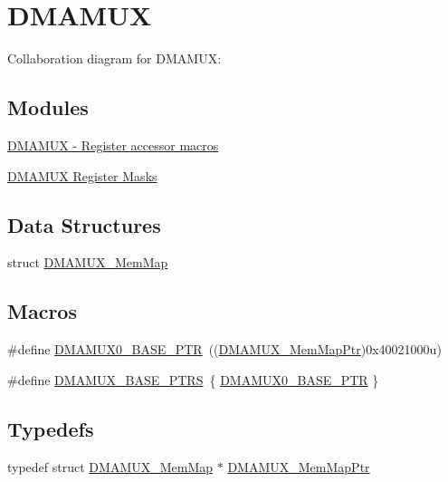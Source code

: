 \hypertarget{group___d_m_a_m_u_x___peripheral}{}\section{D\+M\+A\+M\+UX}
\label{group___d_m_a_m_u_x___peripheral}
Collaboration diagram for D\+M\+A\+M\+UX\+:
\subsection*{Modules}
\begin{DoxyCompactItemize}
\item 
\hyperlink{group___d_m_a_m_u_x___register___accessor___macros}{D\+M\+A\+M\+U\+X -\/ Register accessor macros}
\item 
\hyperlink{group___d_m_a_m_u_x___register___masks}{D\+M\+A\+M\+U\+X Register Masks}
\end{DoxyCompactItemize}
\subsection*{Data Structures}
\begin{DoxyCompactItemize}
\item 
struct \hyperlink{struct_d_m_a_m_u_x___mem_map}{D\+M\+A\+M\+U\+X\+\_\+\+Mem\+Map}
\end{DoxyCompactItemize}
\subsection*{Macros}
\begin{DoxyCompactItemize}
\item 
\#define \hyperlink{group___d_m_a_m_u_x___peripheral_ga403b61d306820e4e1113c636300004a3}{D\+M\+A\+M\+U\+X0\+\_\+\+B\+A\+S\+E\+\_\+\+P\+TR}~((\hyperlink{group___d_m_a_m_u_x___peripheral_ga736ab5b1ed284b3b4fdb63010a576777}{D\+M\+A\+M\+U\+X\+\_\+\+Mem\+Map\+Ptr})0x40021000u)
\item 
\#define \hyperlink{group___d_m_a_m_u_x___peripheral_gaad218c12978071501dc2899f0624de4b}{D\+M\+A\+M\+U\+X\+\_\+\+B\+A\+S\+E\+\_\+\+P\+T\+RS}~\{ \hyperlink{group___d_m_a_m_u_x___peripheral_ga403b61d306820e4e1113c636300004a3}{D\+M\+A\+M\+U\+X0\+\_\+\+B\+A\+S\+E\+\_\+\+P\+TR} \}
\end{DoxyCompactItemize}
\subsection*{Typedefs}
\begin{DoxyCompactItemize}
\item 
typedef struct \hyperlink{struct_d_m_a_m_u_x___mem_map}{D\+M\+A\+M\+U\+X\+\_\+\+Mem\+Map} $\ast$ \hyperlink{group___d_m_a_m_u_x___peripheral_ga736ab5b1ed284b3b4fdb63010a576777}{D\+M\+A\+M\+U\+X\+\_\+\+Mem\+Map\+Ptr}
\end{DoxyCompactItemize}


